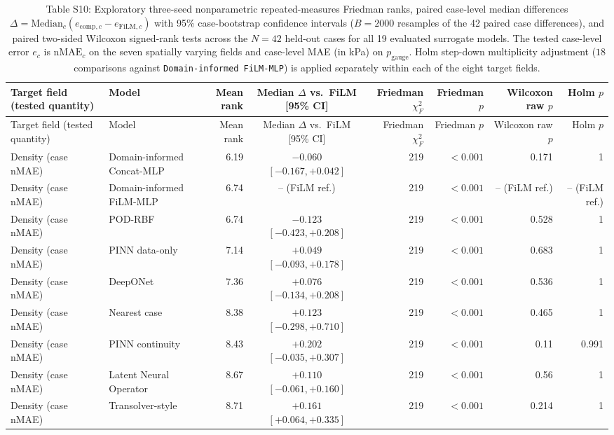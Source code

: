 \begin{landscape}\scriptsize
\begin{longtable}{p{4.0cm}p{3.4cm}rcrrrr}
\caption{Table S10: Exploratory three-seed nonparametric repeated-measures Friedman ranks, paired case-level median differences $\Delta = \mathrm{Median}_c(e_{\mathrm{comp},c}-e_{\mathrm{FiLM},c})$ with 95\% case-bootstrap confidence intervals ($B=2000$ resamples of the 42 paired case differences), and paired two-sided Wilcoxon signed-rank tests across the $N=42$ held-out cases for all 19 evaluated surrogate models. The tested case-level error $e_c$ is $\mathrm{nMAE}_c$ on the seven spatially varying fields and case-level MAE (in kPa) on $p_{\mathrm{gauge}}$. Holm step-down multiplicity adjustment ($18$ comparisons against \texttt{Domain-informed FiLM-MLP}) is applied separately within each of the eight target fields.}\\
\toprule Target field (tested quantity) & Model & Mean rank & Median $\Delta$ vs.\ FiLM [95\% CI] & Friedman $\chi^2_F$ & Friedman $p$ & Wilcoxon raw $p$ & Holm $p$\\
\midrule\endfirsthead
\toprule Target field (tested quantity) & Model & Mean rank & Median $\Delta$ vs.\ FiLM [95\% CI] & Friedman $\chi^2_F$ & Friedman $p$ & Wilcoxon raw $p$ & Holm $p$\\
\midrule\endhead
Density (case nMAE) & Domain-informed Concat-MLP & 6.19 & $-0.060$ $[-0.167, +0.042]$ & 219 & $< 0.001$ & 0.171 & 1 \\
Density (case nMAE) & Domain-informed FiLM-MLP & 6.74 & -- (FiLM ref.) & 219 & $< 0.001$ & -- (FiLM ref.) & -- (FiLM ref.) \\
Density (case nMAE) & POD-RBF & 6.74 & $-0.123$ $[-0.423, +0.208]$ & 219 & $< 0.001$ & 0.528 & 1 \\
Density (case nMAE) & PINN data-only & 7.14 & $+0.049$ $[-0.093, +0.178]$ & 219 & $< 0.001$ & 0.683 & 1 \\
Density (case nMAE) & DeepONet & 7.36 & $+0.076$ $[-0.134, +0.208]$ & 219 & $< 0.001$ & 0.536 & 1 \\
Density (case nMAE) & Nearest case & 8.38 & $+0.123$ $[-0.298, +0.710]$ & 219 & $< 0.001$ & 0.465 & 1 \\
Density (case nMAE) & PINN continuity & 8.43 & $+0.202$ $[-0.035, +0.307]$ & 219 & $< 0.001$ & 0.11 & 0.991 \\
Density (case nMAE) & Latent Neural Operator & 8.67 & $+0.110$ $[-0.061, +0.160]$ & 219 & $< 0.001$ & 0.56 & 1 \\
Density (case nMAE) & Transolver-style & 8.71 & $+0.161$ $[+0.064, +0.335]$ & 219 & $< 0.001$ & 0.214 & 1 \\

\end{longtable}
\end{landscape}
